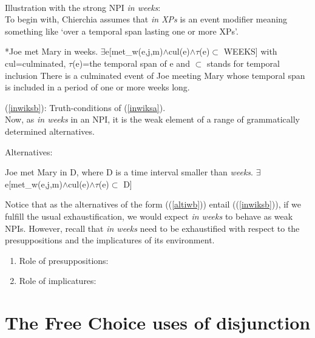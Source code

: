 \documentclass[a4paper,11pt]{article}
\newcommand{\reff}[1]{(\ref{#1})}
\begin{document}
\paragraph{}
Illustration with the strong NPI \textit{in weeks}:
\\To begin with, Chierchia assumes that \textit{in XPs} is an event modifier meaning something like `over a temporal span lasting one or more XPs'.
\begin{exe}
\ex\label{inwiks} \begin{xlist}
\ex\label{inwiksa} *Joe met Mary in weeks.
\ex\label{inwiksb} $\exists$e[met_w(e,j,m)$\wedge$cul(e)$\wedge\tau$(e)$\subset$ WEEKS] with cul=culminated, $\tau$(e)=the temporal span of e and $\subset$ stands for temporal inclusion
\ex\label{inwiksc} There is a culminated event of Joe meeting Mary whose temporal span is included in a period of one or more weeks long.
\end{xlist}
\end{exe}
\reff{inwiksb}: Truth-conditions of \reff{inwiksa}.
\\Now, as \textit{in weeks} in an NPI, it is the weak element of a range of grammatically determined alternatives.
\begin{exe}
\ex\label{altiw} Alternatives: \begin{xlist}
\ex\label{altiwa} Joe met Mary in D, where D is a time interval smaller than \textit{weeks}.
\ex\label{altiwb} $\exists$e[met_w(e,j,m)$\wedge$cul(e)$\wedge\tau$(e)$\subset$ D]
\end{xlist}
\end{exe}
Notice that as the alternatives of the form (\reff{altiwb}) entail (\reff{inwiksb}), if we fulfill the usual exhaustification, we would expect \textit{in weeks} to behave as weak NPIs. However, recall that \textit{in weeks} need to be exhaustified with respect to the presuppositions and the implicatures of its environment.
\begin{enumerate}
\item Role of presuppositions: 
\item Role of implicatures:
\end{enumerate}


\section{The Free Choice uses of disjunction}
\end{document}
